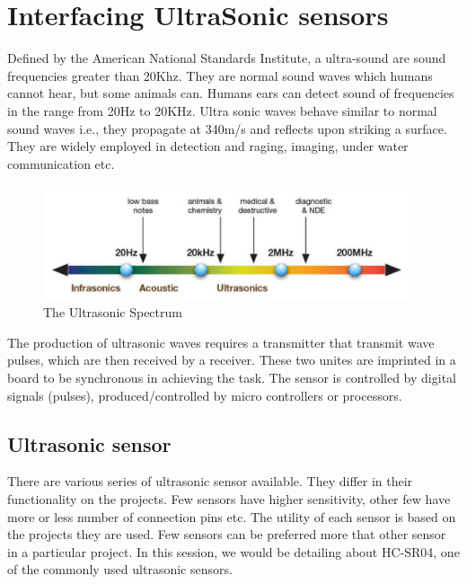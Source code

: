 \chapter{Interfacing UltraSonic sensors}
\label{ch:ultrasonic}
\par Defined by the American National Standards Institute, a ultra-sound are sound frequencies greater than 20Khz. They are normal sound waves which humans cannot hear, but some animals can. Humans ears can detect sound of frequencies in the range from 20Hz to 20KHz. Ultra sonic waves behave similar to normal sound waves i.e., they propagate at 340m/s and reflects upon striking a surface. They are widely employed in detection and raging, imaging, under water communication etc.

\begin{figure}
	\centering
	\includegraphics[width=4.3in]{Images/Ultrasonic/spectrum.png}
	\caption{The Ultrasonic Spectrum}
\end{figure}

 The production of ultrasonic waves requires a transmitter that transmit wave pulses, which are then received by a receiver. These two unites are imprinted in a board to be synchronous in achieving the task. The sensor is controlled by digital signals (pulses), produced/controlled by micro controllers or processors. 

\section{Ultrasonic sensor}
\par There are various series of ultrasonic sensor available. They differ in their functionality on the projects. Few sensors have higher sensitivity, other few have more or less number of connection pins etc. The utility of each sensor is based on the projects they are used. Few sensors can be preferred more that other sensor in a particular project. In this session, we would be detailing about HC-SR04,  one of the commonly used ultrasonic sensors.

